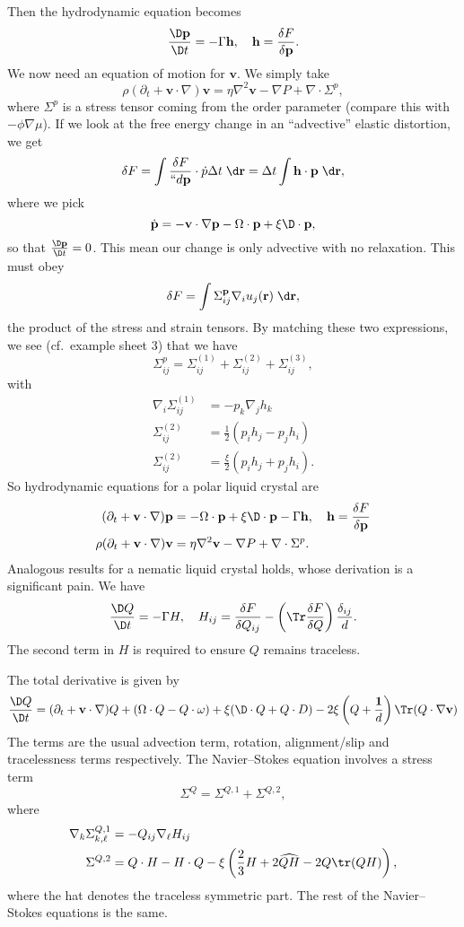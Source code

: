 \documentclass[a4paper]{article}
\begin{document}
Then the hydrodynamic equation becomes
\[
  \frac{\D \mathbf{p}}{\D t} = - \Gamma \mathbf{h},\quad \mathbf{h} = \frac{\delta F}{\delta \mathbf{p}}.
\]
We now need an equation of motion for $\mathbf{v}$. We simply take
\[
  \rho(\partial_t +\mathbf{v} \cdot \nabla) \mathbf{v} = \eta \nabla^2 \mathbf{v} - \nabla P + \nabla \cdot \Sigma^p,
\]
where $\Sigma^p$ is a stress tensor coming from the order parameter (compare this with $- \phi \nabla \mu$). If we look at the free energy change in an ``advective'' elastic distortion, we get
\[
  \delta F = \int \frac{\delta F}{``d \mathbf{p}} \cdot \dot{p} \Delta t \;\d \mathbf{r} = \Delta t \int \mathbf{h} \cdot \mathbf{p} \;\d \mathbf{r},
\]
where we pick
\[
  \dot{\mathbf{p}} = - \mathbf{v} \cdot \nabla \mathbf{p} - \Omega \cdot \mathbf{p} + \xi \D \cdot \mathbf{p},
\]
so that $\frac{\D \mathbf{p}}{\D t} = 0$. This mean our change is only advective with no relaxation. This must obey
\[
  \delta F = \int \Sigma_{ij}^{\mathbf{p}} \nabla_i u_j(\mathbf{r}) \;\d \mathbf{r},
\]
the product of the stress and strain tensors. By matching these two expressions, we see (cf.\ example sheet 3) that we have
\[
  \Sigma_{ij}^p = \Sigma_{ij}^{(1)} + \Sigma_{ij}^{(2)} + \Sigma_{ij}^{(3)},
\]
with
\begin{align*}
  \nabla_i \Sigma_{ij}^{(1)} &= - p_k \nabla_j h_k\\
  \Sigma_{ij}^{(2)} &= \frac{1}{2} (p_i h_j - p_j h_i)\\
  \Sigma_{ij}^{(2)} &= \frac{\xi}{2} (p_i h_j + p_j h_i).
\end{align*}
So hydrodynamic equations for a polar liquid crystal are
\begin{align*}
  (\partial_t + \mathbf{v} \cdot \nabla)\mathbf{p} &= - \Omega \cdot \mathbf{p} + \xi \D \cdot \mathbf{p} - \Gamma \mathbf{h},\quad \mathbf{h} = \frac{\delta F}{\delta \mathbf{p}}\\
  \rho (\partial_t + \mathbf{v} \cdot \nabla)\mathbf{v} &= \eta \nabla^2 \mathbf{v} - \nabla P + \nabla \cdot \Sigma^p.
\end{align*}
Analogous results for a nematic liquid crystal holds, whose derivation is a significant pain. We have
\[
  \frac{\D Q}{\D t} = - \Gamma H,\quad H_{ij} = \frac{\delta F}{\delta Q_{ij}} - \left( \Tr\frac{\delta F}{\delta Q}\right) \frac{\delta_{ij}}{d}.
\]
The second term in $H$ is required to ensure $Q$ remains traceless.

The total derivative is given by
\[
  \frac{\D Q}{\D t} = (\partial_t + \mathbf{v} \cdot \nabla) Q + (\Omega \cdot Q - Q \cdot \omega) + \xi (\D \cdot Q + Q \cdot D) - 2\xi \left(Q + \frac{\mathbf{1}}{d}\right) \Tr(Q \cdot \nabla \mathbf{v})
\]
The terms are the usual advection term, rotation, alignment/slip and tracelessness terms respectively. The Navier--Stokes equation involves a stress term
\[
  \Sigma^Q = \Sigma^{Q, 1} + \Sigma^{Q, 2},
\]
where
\begin{align*}
  \nabla_k \Sigma^{Q, 1}_{k, \ell} &= - Q_{ij} \nabla_\ell H_{ij}\\
  \Sigma^{Q, 2} &= Q \cdot H - H \cdot Q - \xi \left(\frac{2}{3} H + 2 \widehat{QH} - 2 Q \tr (Q H)\right),
\end{align*}
where the hat denotes the traceless symmetric part. The rest of the Navier--Stokes equations is the same.
\end{document}
